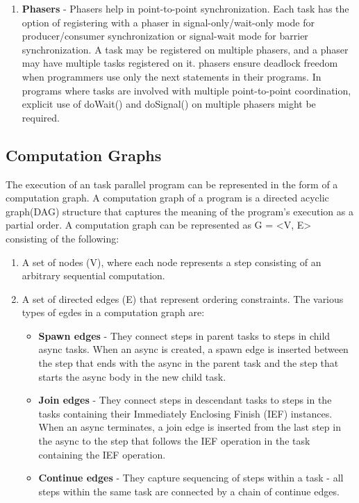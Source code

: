 \begin{enumerate}
\begin{enumerate}
\item \textbf{Phasers} - Phasers help in point-to-point synchronization. Each task has the option of registering with a phaser in signal-only/wait-only mode for producer/consumer synchronization or signal-wait mode for barrier synchronization. A task may be registered on multiple phasers, and a phaser may have multiple tasks registered on it. phasers ensure deadlock freedom when programmers use only the next statements in their programs. In programs where tasks are involved with multiple point-to-point coordination, explicit use of doWait() and doSignal() on multiple phasers might be required. 
\end{enumerate}
\end{enumerate}
\subsection{Computation Graphs}
The execution of an task parallel program can be represented in the form of a computation graph. A computation graph of a program is a directed acyclic graph(DAG) structure that captures the meaning of the program's execution as a partial order. A computation graph can be represented as G = <V, E> consisting of the following:
\begin{enumerate}
\item A set of nodes (V), where each node represents a step consisting of an arbitrary sequential computation. 
\item A set of directed edges (E) that represent ordering constraints. The various types of egdes in a computation graph are:
\begin{itemize}
 \item \textbf{Spawn edges} - They connect steps in parent tasks to steps in child async tasks. When an async is created, a spawn edge is inserted between the step that ends with the async in the parent task and the step that starts the async body in the new child task.
\item \textbf{Join edges} - They connect steps in descendant tasks to steps in the tasks containing their Immediately Enclosing Finish (IEF) instances. When an async terminates, a join edge is inserted from the last step in the async to the step that follows the IEF operation in the task containing the IEF operation.
\item \textbf{Continue edges} - They capture sequencing of steps within a task - all steps within the same task are connected by a chain of continue edges.
 \end{itemize} 
\end{enumerate}

